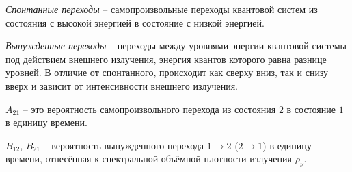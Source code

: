 

\emph{Спонтанные переходы} -- самопроизвольные переходы квантовой систем 
из состояния с высокой энергией в состояние с низкой энергией.

\emph{Вынужденные переходы} -- переходы между уровнями энергии квантовой 
системы под действием внешнего излучения, энергия квантов которого равна 
разнице уровней. В отличие от спонтанного, происходит как сверху вниз, так 
и снизу вверх и зависит от интенсивности внешнего излучения.


\begin{figure}[h!]
	\center
	\label{img1.1}
\end{figure}

\( A_{21} \) -- это вероятность самопроизвольного перехода из состояния 
\( 2 \) в состояние \( 1 \) в единицу времени. 

\( B_{12} \), \( B_{21} \) -- вероятность вынужденного перехода 
\( 1 \rightarrow 2 \) (\( 2 \rightarrow 1 \)) в единицу времени, отнесённая к 
спектральной объёмной плотности излучения \( \rho_\nu \).
